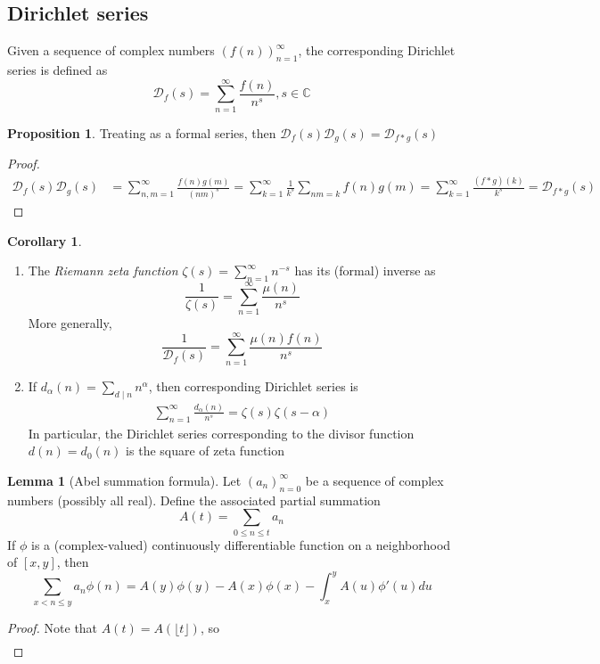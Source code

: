 \documentclass{article}
\theoremstyle{definition}
\newtheorem{corollary}[theorem]{Corollary}
\newtheorem{lemma}[theorem]{Lemma}
\newtheorem{proposition}[theorem]{Proposition}
\begin{document}
\begin{shaded}
\section{Dirichlet series}
Given a sequence of complex numbers $(f(n))_{n = 1}^\infty$, the corresponding Dirichlet series is defined as
$$\mathcal{D}_f (s) = \sum_{n = 1}^\infty \frac{f(n)}{n^s}, s \in \mathbb{C}$$
\begin{proposition}
Treating as a formal series, then $\mathcal{D}_f (s) \mathcal{D}_g(s) = \mathcal{D}_{f*g} (s)$
\end{proposition}
\begin{proof}
\begin{align*}
\mathcal{D}_f (s) \mathcal{D}_g(s) & = \sum_{n, m = 1}^\infty \frac{f(n) g(m)}{(nm)^s} = \sum_{k = 1}^\infty \frac{1}{k^s} \sum_{nm=k} f(n) g(m) = \sum_{k = 1}^\infty \frac{(f*g)(k)}{k^s} = \mathcal{D}_{f*g}(s)
\end{align*}
\end{proof}
\begin{corollary} \ 
\begin{enumerate}
	\item The \emph{Riemann zeta function} $\zeta(s) = \sum_{n = 1}^\infty n^{-s}$ has its (formal) inverse as
	$$\frac{1}{\zeta(s)} = \sum_{n = 1}^\infty \frac{\mu(n)}{n^s}$$
	More generally,
	$$\frac{1}{\mathcal{D}_f (s)} = \sum_{n = 1}^\infty \frac{\mu(n) f(n)}{n^s}$$
	\item If $d_\alpha(n) = \sum_{d \mid n} n^\alpha$, then corresponding Dirichlet series is
	\begin{align*}
	\sum_{n = 1}^\infty \frac{d_\alpha(n)}{n^s} = \zeta(s) \zeta(s - \alpha)
	\end{align*}
	In particular, the Dirichlet series corresponding to the divisor function $d(n) = d_0 (n)$ is the square of zeta function
\end{enumerate}
\end{corollary}
\begin{lemma}[Abel summation formula]
Let $(a_n)_{n = 0}^\infty$ be a sequence of complex numbers (possibly all real). Define the associated partial summation
$$A(t) = \sum_{0 \leq n \leq t} a_n$$
If $\phi$ is a (complex-valued) continuously differentiable function on a neighborhood of $[x, y]$, then
$$\sum_{x < n \leq y} a_n \phi(n) = A(y) \phi(y) - A(x) \phi(x) - \int_x^y A(u) \phi'(u) du$$
\end{lemma}
\begin{proof}
Note that $A(t) = A (\lfloor t \rfloor)$, so
\begin{align*}

\end{align*}
\end{proof}
\end{shaded}
\end{document}
